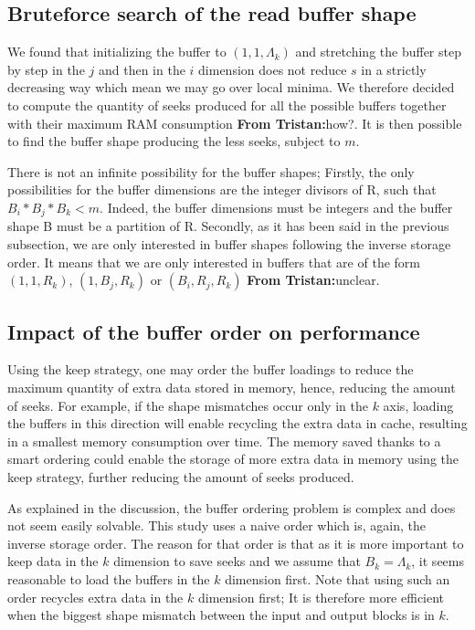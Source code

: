 \documentclass[sigconf, nonacm]{acmart}
\newcommand{\tristan}[1]{\color{orange}\textbf{From Tristan:}#1\color{black}}
\begin{document}
\subsection{Bruteforce search of the read buffer shape}
We found that initializing the buffer to $(1,1,\Lambda_k)$ and stretching the
buffer step by step in the $j$ and then in the $i$ dimension does not reduce
$s$ in a strictly decreasing way which mean we may go over local minima.
We therefore decided to compute the quantity of seeks produced for all the
possible buffers together with their maximum RAM consumption \tristan{how?}.
It is then possible to find the buffer shape producing the less seeks, subject
to $m$.

There is not an infinite possibility for the buffer shapes;
Firstly, the only possibilities for the buffer dimensions are the integer
divisors of R, such that $B_i*B_j*B_k < m$. Indeed, the buffer dimensions must
be integers and the buffer shape B must be a partition of R.
Secondly, as it has been said in the previous subsection, we are only
interested in buffer shapes following the inverse storage order.
It means that we are only interested in buffers that are of the form
$(1,1,R_k)$, $(1,B_j,R_k)$ or $(B_i,R_j,R_k)$ \tristan{unclear}.

\subsection{Impact of the buffer order on performance}
Using the keep strategy, one may order the buffer loadings to reduce the maximum
quantity of extra data stored in memory, hence, reducing the amount of seeks.
For example, if the shape mismatches occur only in the $k$ axis, loading the
buffers in this direction will enable recycling the extra data in cache,
resulting in a smallest memory consumption over time.
The memory saved thanks to a smart
ordering could enable the storage of more extra data in memory using the
keep strategy, further reducing the amount of seeks produced.

As explained in the discussion, the buffer ordering problem is complex and does
not seem easily solvable.
This study uses a naive order which is, again, the inverse storage order.
The reason for that order is that as it is more important to keep data in the
$k$ dimension to save seeks and we assume that $B_k=\Lambda_k$, it seems
reasonable to load the buffers in the $k$ dimension first.
Note that using such
an order recycles extra data in the $k$ dimension first; It is therefore
more efficient when the biggest shape mismatch between the input and output
blocks is in $k$.
\end{document}
